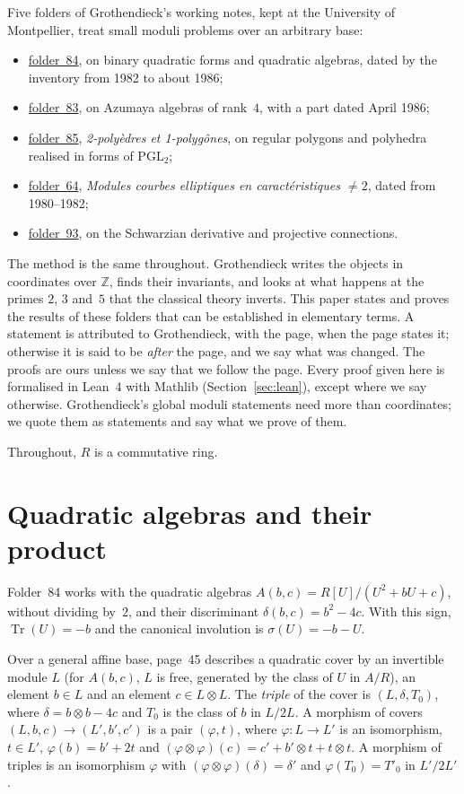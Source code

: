 \documentclass[11pt,a4paper]{amsart}
\theoremstyle{definition}
\theoremstyle{remark}
\newcommand{\Z}{\mathbb Z}
\newcommand{\PGL}{\mathrm{PGL}_2}
\newcommand{\Tr}{\operatorname{Tr}}
\newcommand{\fac}[1]{\href{https://grothendieck.umontpellier.fr/#1.pdf}{folder~#1}}
\begin{document}
Five folders of Grothendieck's working notes, kept at the University of Montpellier, treat small moduli problems over an arbitrary base:
\begin{itemize}[leftmargin=1.5em]
\item \fac{84}, on binary quadratic forms and quadratic algebras, dated by the inventory from 1982 to about 1986;
\item \fac{83}, on Azumaya algebras of rank~$4$, with a part dated April 1986;
\item \fac{85}, \emph{2-polyèdres et 1-polygônes}, on regular polygons and polyhedra realised in forms of $\PGL$;
\item \fac{64}, \emph{Modules courbes elliptiques en caractéristiques $\neq 2$}, dated from 1980--1982;
\item \fac{93}, on the Schwarzian derivative and projective connections.
\end{itemize}
The method is the same throughout. Grothendieck writes the objects in coordinates over $\Z$, finds their invariants, and looks at what happens at the primes $2$, $3$ and~$5$ that the classical theory inverts. This paper states and proves the results of these folders that can be established in elementary terms. A statement is attributed to Grothendieck, with the page, when the page states it; otherwise it is said to be \emph{after} the page, and we say what was changed. The proofs are ours unless we say that we follow the page. Every proof given here is formalised in Lean~4 with Mathlib (Section~\ref{sec:lean}), except where we say otherwise. Grothendieck's global moduli statements need more than coordinates; we quote them as statements and say what we prove of them.

Throughout, $R$ is a commutative ring.

\section{Quadratic algebras and their product}\label{sec:quad}

Folder~84 works with the quadratic algebras $A(b,c) = R[U]/(U^2 + bU + c)$, without dividing by~$2$, and their discriminant $\delta(b,c) = b^2 - 4c$. With this sign, $\Tr(U) = -b$ and the canonical involution is $\sigma(U) = -b - U$.

Over a general affine base, page~45 describes a quadratic cover by an invertible module $L$ (for $A(b, c)$, $L$ is free, generated by the class of $U$ in $A/R$), an element $b \in L$ and an element $c \in L \otimes L$. The \emph{triple} of the cover is $(L, \delta, T_0)$, where $\delta = b \otimes b - 4c$ and $T_0$ is the class of $b$ in $L/2L$. A morphism of covers $(L, b, c) \to (L', b', c')$ is a pair $(\varphi, t)$, where $\varphi\colon L \to L'$ is an isomorphism, $t \in L'$, $\varphi(b) = b' + 2t$ and $(\varphi\otimes\varphi)(c) = c' + b'\otimes t + t\otimes t$. A morphism of triples is an isomorphism $\varphi$ with $(\varphi \otimes \varphi)(\delta) = \delta'$ and $\varphi(T_0) = T'_0$ in $L'/2L'$.
\end{document}
